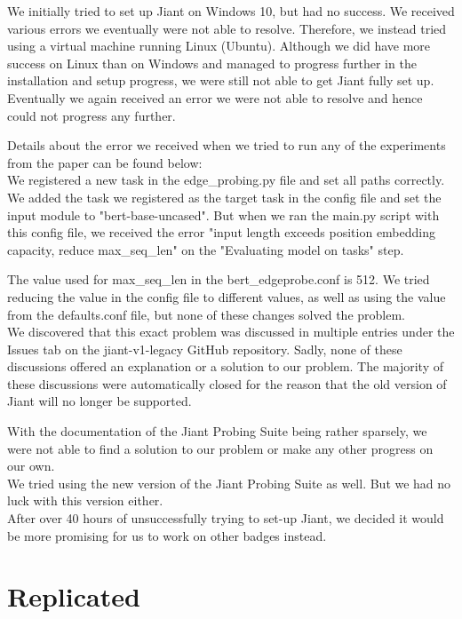 \documentclass{article}
\begin{document}
	We initially tried to set up Jiant on Windows 10, but had no success. We received various errors we eventually were not able to resolve. Therefore, we instead tried using a virtual machine running Linux (Ubuntu). Although we did have more success on Linux than on Windows and managed to progress further in the installation and setup progress, we were still not able to get Jiant fully set up. Eventually we again received an error we were not able to resolve and hence could not progress any further. 
	
	Details about the error we received when we tried to run any of the experiments from the paper can be found below:\\
	
	We registered a new task in the edge\_probing.py file and set all paths correctly. We added the task we registered as the target task in the config file and set the input module to "bert-base-uncased". But when we ran the main.py script with this config file, we received the error "input length exceeds position embedding capacity, reduce max\_seq\_len" on the "Evaluating model on tasks" step. 
	
	The value used for max\_seq\_len in the bert\_edgeprobe.conf is 512. We tried reducing the value in the config file to different values, as well as using the value from the defaults.conf file, but none of these changes solved the problem.\\
	
	We discovered that this exact problem was discussed in multiple entries under the Issues tab on the jiant-v1-legacy GitHub repository. Sadly, none of these discussions offered an explanation or a solution to our problem. The majority of these discussions were automatically closed for the reason that the old version of Jiant will no longer be supported.
	
	With the documentation of the Jiant Probing Suite being rather sparsely, we were not able to find a solution to our problem or make any other progress on our own.\\
	
	We tried using the new version of the Jiant Probing Suite as well. But we had no luck with this version either.\\
	
	After over 40 hours of unsuccessfully trying to set-up Jiant, we decided it would be more promising for us to work on other badges instead.
	
	\section{Replicated}
\end{document}
